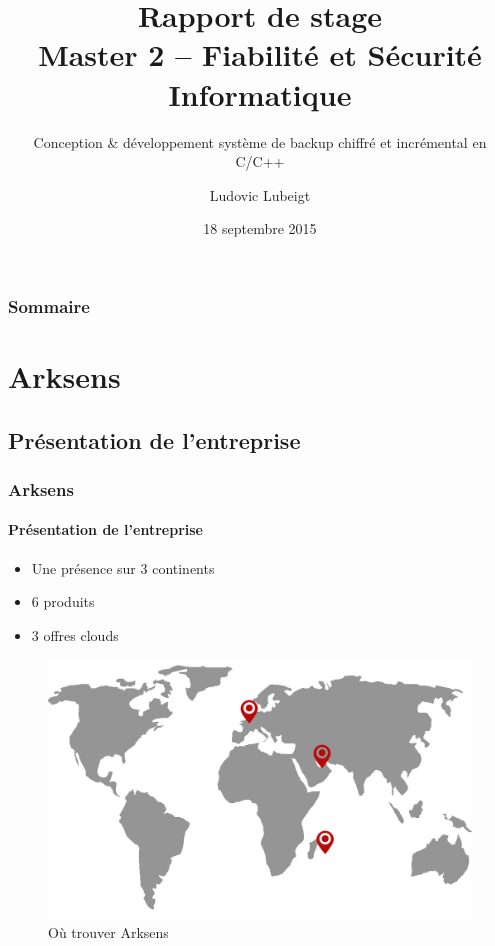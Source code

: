 \documentclass{beamer}
\title{Rapport de stage\\Master 2 -- Fiabilité et Sécurité Informatique}
\subtitle{Conception \&  d\'eveloppement syst\`eme de backup chiffr\'e et
incr\'emental en C/C++}
\author{Ludovic Lubeigt}
\institute{Aix-Marseille University}
\date{18 septembre 2015}
\begin{document}
\begin{frame}
 \titlepage
\end{frame}

\begin{frame}
 \frametitle{Sommaire}
 \tableofcontents
\end{frame}

\section{Arksens}
\subsection{Pr\'esentation de l'entreprise}
\begin{frame}
 \frametitle{Arksens}
 \framesubtitle{Pr\'esentation de l'entreprise}
 \begin{minipage}{0.49\textwidth}
  \begin{itemize}
    \item Une pr\'esence sur 3 continents
    \item 6 produits
    \item 3 offres clouds
  \end{itemize}
 \end{minipage}
 \begin{minipage}{0.49\textwidth}
  \begin{figure}[h!]
    \centering
    \includegraphics[scale=0.15]{map_arksens.png}
    \caption{\label{mapArksens} O\`u trouver Arksens}
  \end{figure}
 \end{minipage}
\end{frame}
\end{document}
